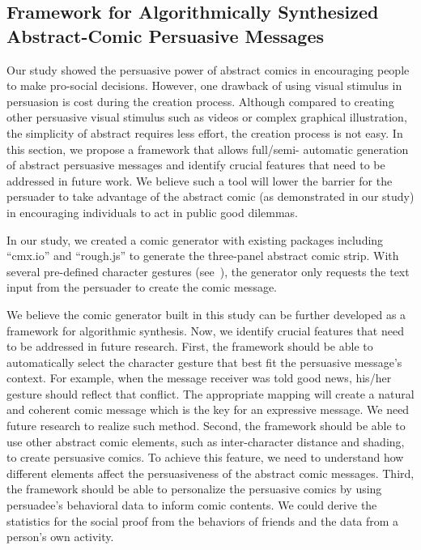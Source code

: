 
 \subsection{Framework for Algorithmically Synthesized Abstract-Comic Persuasive Messages}
 \label{sub:framework}
 
Our study showed the persuasive power of abstract comics in encouraging people to make pro-social decisions. However, one drawback of using visual stimulus in persuasion is cost during the creation process. Although compared to creating other persuasive visual stimulus such as videos or complex graphical illustration, the simplicity of abstract requires less effort, the creation process is not easy. In this section, we propose a framework that allows full/semi- automatic generation of abstract persuasive messages and identify crucial features that need to be addressed in future work. We believe such a tool will lower the barrier for the persuader to take advantage of the abstract comic (as demonstrated in our study) in encouraging individuals to act in public good dilemmas.

In our study, we created a comic generator with existing packages including ``cmx.io'' \cite{cmx.io} and ``rough.js'' \cite{rough.js} to generate the three-panel abstract comic strip. With several pre-defined character gestures (see~), the generator only requests the text input from the persuader to create the comic message.  

We believe the comic generator built in this study can be further developed as a framework for algorithmic synthesis. Now, we identify crucial features that need to be addressed in future research. First, the framework should be able to automatically select the character gesture that best fit the persuasive message's context. For example, when the message receiver was told good news, his/her gesture should reflect that conflict. The appropriate mapping will create a natural and coherent comic message which is the key for an expressive message. We need future research to realize such method. Second, the framework should be able to use other abstract comic elements, such as inter-character distance and shading, to create persuasive comics. To achieve this feature, we need to understand how different elements affect the persuasiveness of the abstract comic messages. Third, the framework should be able to personalize the persuasive comics by using persuadee's behavioral data to inform comic contents. We could derive the statistics for the social proof from the behaviors of friends and the data from a person's own activity.

